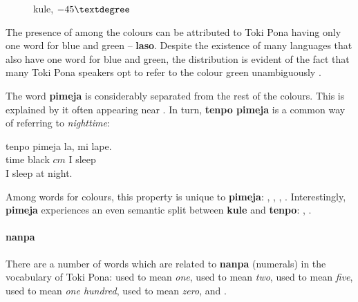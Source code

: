 \documentclass[14pt, a4paper]{extreport}
\makeatletter
\DeclareRobustCommand\ttfamily
        {\not@math@alphabet\ttfamily\mathtt
         \fontfamily\ttdefault\small\selectfont}
\makeatother
\begin{document}
\begin{figure}[ht]%
  \def\angle{-45}
  \bigskip
  \centering
  \caption{kule, \(\angle\textdegree\)}
\end{figure}%

The presence of  among the colours can be attributed to Toki Pona having only one word for blue and green -- \textbf{laso}. Despite the existence of many languages that also have one word for blue and green, the distribution is evident of the fact that many Toki Pona speakers opt to refer to the colour green unambiguously .

The word \textbf{pimeja} is considerably separated from the rest of the colours. This is explained by it often appearing near . In turn, \textbf{tenpo pimeja} is a common way of referring to \textit{nighttime}:

\begin{exe}
  \ex
  \gll tenpo pimeja la, mi lape. \\
       time black $cm$ I sleep \\
  \glt I sleep at night.
\end{exe}

Among words for colours, this property is unique to \textbf{pimeja}: , , , . Interestingly, \textbf{pimeja} experiences an even semantic split between \textbf{kule} and \textbf{tenpo}: , .
        \paragraph{nanpa}
There are a number of words which are related to \textbf{nanpa} (numerals) in the vocabulary of Toki Pona:  used to mean \textit{one},  used to mean \textit{two},  used to mean \textit{five},  used to mean \textit{one hundred},  used to mean \textit{zero}, and .
\end{document}
